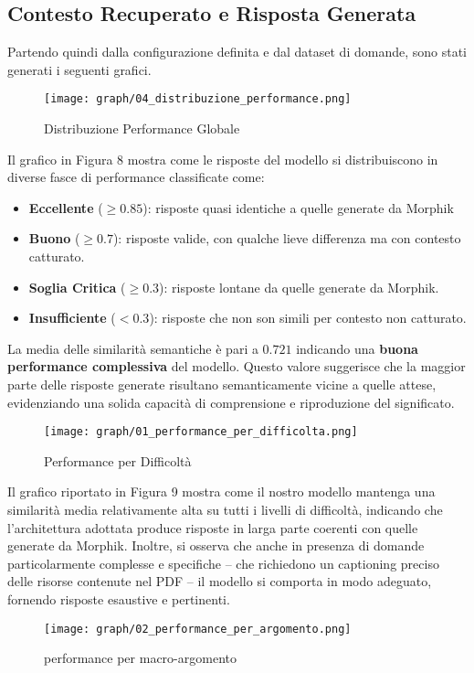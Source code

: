 \subsection{Contesto Recuperato e Risposta Generata}
Partendo quindi dalla configurazione definita e dal dataset di domande, sono stati generati i seguenti grafici.
\begin{figure}[H]
\centering
\texttt{[image: graph/04\_distribuzione\_performance.png]}
\caption{Distribuzione Performance Globale}
\end{figure}
Il grafico in Figura 8 mostra come le risposte del modello si distribuiscono in diverse fasce di performance classificate come:
\begin{itemize}
    \item \textbf{Eccellente} (\(\geq0.85\)): risposte quasi identiche a quelle generate da Morphik
    \item \textbf{Buono} (\(\geq0.7\)): risposte valide, con qualche lieve differenza ma con contesto catturato.
    \item \textbf{Soglia Critica} (\(\geq0.3\)): risposte lontane da quelle generate da Morphik.
    \item \textbf{Insufficiente} (\(<0.3\)): risposte che non son simili per contesto non catturato.
\end{itemize}
La media delle similarità semantiche è pari a $0.721$ indicando una \textbf{buona performance complessiva} del modello. Questo valore suggerisce che la maggior parte delle risposte generate risultano semanticamente vicine a quelle attese, evidenziando una solida capacità di comprensione e riproduzione del significato.

\begin{figure}[H]
\centering
\texttt{[image: graph/01\_performance\_per\_difficolta.png]}
\caption{Performance per Difficoltà}
\end{figure}

Il grafico riportato in Figura 9 mostra come il nostro modello mantenga una similarità media relativamente alta su tutti i livelli di difficoltà, indicando che l’architettura adottata produce risposte in larga parte coerenti con quelle generate da Morphik. Inoltre, si osserva che anche in presenza di domande particolarmente complesse e specifiche – che richiedono un captioning preciso delle risorse contenute nel PDF – il modello si comporta in modo adeguato, fornendo risposte esaustive e pertinenti.

\begin{figure}[H]
\centering
\texttt{[image: graph/02\_performance\_per\_argomento.png]}
\caption{performance per macro-argomento}
\end{figure}

